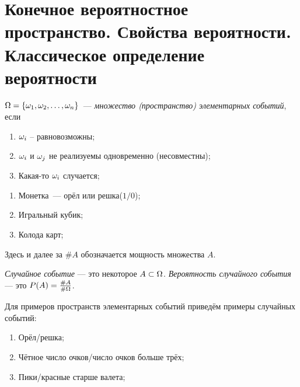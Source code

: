 \section{Конечное вероятностное пространство. Свойства вероятности. Классическое определение вероятности}

\begin{definition}
    $\Omega = \{\omega_1, \omega_2, \ldots, \omega_n\}$~--- \textit{множество (пространство) элементарных событий}, если
    \begin{enumerate}
        \item $\omega_i$ -- равновозможны;
        \item $\omega_i$ и $\omega_j$ не реализуемы одновременно (несовместны);
        \item Какая-то $\omega_i$ случается;
    \end{enumerate}
\end{definition}

\begin{examples}
   \enewline
    \begin{enumerate}
        \item Монетка~--- орёл или решка($1/0$);
        \item Игральный кубик;
        \item Колода карт;
    \end{enumerate}
\end{examples}
Здесь и далее за $\#A$ обозначается мощность множества $A$.
\begin{definition}
   \textit{Случайное событие} --- это некоторое $A \subset \Omega$.
   \textit{Вероятность случайного события} --- это $P(A)= \frac{\#A}{\#\Omega}$.
\end{definition}

Для примеров пространств элементарных событий приведём примеры случайных событий: 
\begin{examples}
\enewline
    \begin{enumerate}
        \item Орёл/решка;
        \item Чётное число очков/число очков больше трёх;
        \item Пики/красные старше валета;
    \end{enumerate}
\end{examples}

